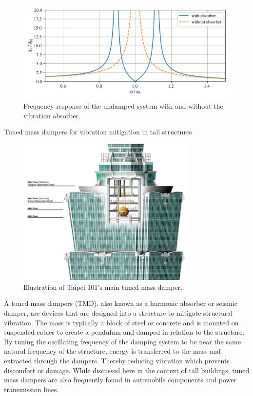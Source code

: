 \documentclass[12pt,letter]{article}
\begin{document}
\begin{figure}[H]
    \centering
    \includegraphics[width=6.5in]{../figures/vibration_absorber_undamped_results.png}
    \caption{Frequency response of the undamped system with and without the vibration absorber.}
    \label{fig:vibration_absorber_undamped_results}
\end{figure}



\begin{vibration_case_study}
	Tuned mass dampers for vibration mitigation in tall structures
	\begin{figure}[H]
		\centering
		\includegraphics[width=3.5in]{../figures/Taipei_101_Tuned_Mass_Damper.png}
		\caption{Illustration of Taipei 101's main tuned mass damper. \protect\footnotemark[1]}
	\end{figure}
	
	A tuned mass dampers (TMD), also known as a harmonic absorber or seismic damper, are devices that are designed into a structure to mitigate structural vibration. The mass is typically a block of steel or concrete and is mounted on suspended cables to create a pendulum and damped in relation to the structure. By tuning the oscillating frequency of the damping system to be near the same natural frequency of the structure, energy is transferred to the mass and extracted through the dampers. Thereby reducing vibration which prevents discomfort or damage. While discussed here in the context of tall buildings, tuned mass dampers are also frequently found in automobile components and power transmission lines.	
	
\end{vibration_case_study}
\end{document}
